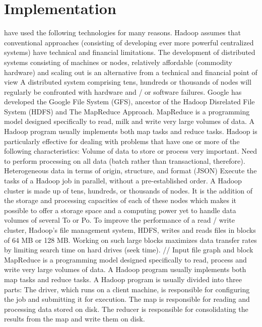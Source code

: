 \documentclass{acmtog} %
\begin{document}
\section{Implementation}
\label{sec:implementation}

\We have used the following technologies for many reasons. Hadoop assumes that conventional approaches (consisting of developing ever more powerful centralized systems) have technical and financial limitations. The development of distributed systems consisting of machines or nodes, relatively affordable (commodity hardware) and scaling out is an alternative from a technical and financial point of view A distributed system comprising tens, hundreds or thousands of nodes will regularly be confronted with hardware and / or software failures. Google has developed the Google File System (GFS), ancestor of the Hadoop Disrelated File System (HDFS) and The MapReduce Approach. MapReduce is a programming model designed specifically to read, milk and write very large volumes of data. A Hadoop program usually implements both map tasks and reduce tasks.
Hadoop is particularly effective for dealing with problems that have one or more of the following characteristics: Volume of data to store or process very important. Need to perform processing on all data (batch rather than transactional, therefore). Heterogeneous data in terms of origin, structure, and format (JSON) Execute the tasks of a Hadoop job in parallel, without a pre-established order. A Hadoop cluster is made up of tens, hundreds, or thousands of nodes. It is the addition of the storage and processing capacities of each of these nodes which makes it possible to offer a storage space and a computing power yet to handle data volumes of several To or Po. To improve the performance of a read / write cluster, Hadoop’s file management system, HDFS, writes and reads files in blocks of 64 MB or 128 MB. Working on such large blocks maximizes data transfer rates by limiting search time on hard drives (seek time). // Input file graph and block MapReduce is a programming model designed specifically to read, process and write very large volumes of data. A Hadoop program usually implements both map tasks and reduce tasks. A Hadoop program is usually divided into three parts: The driver, which runs on a client machine, is responsible for configuring the job and submitting it for execution. The map is responsible for reading and processing data stored on disk. The reducer is responsible for consolidating the results from the map and write them on disk.
\end{document}
